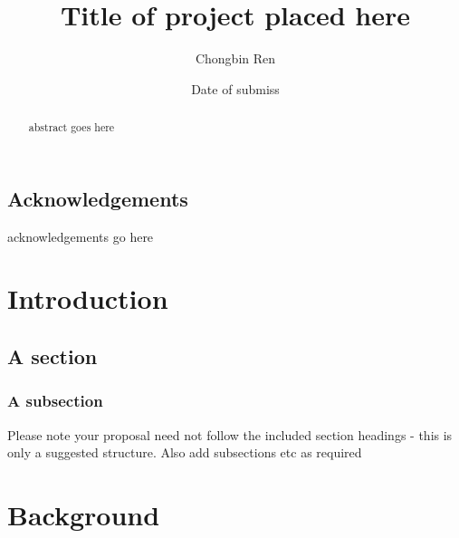 \documentclass{mproj}
\begin{document}
\title{Title of project placed here}
\author{Chongbin Ren}
\date{Date of submiss}
\maketitle

\begin{abstract}
abstract goes here
\end{abstract}

\educationalconsent


\newpage
\section*{Acknowledgements}

acknowledgements go here

\tableofcontents

\chapter{Introduction}\label{intro}

\section{A section}
\subsection{A subsection}
Please note your proposal need not follow the included section headings - this is only a suggested structure. Also add subsections etc as required


\chapter{Background}\label{background}
\end{document}
